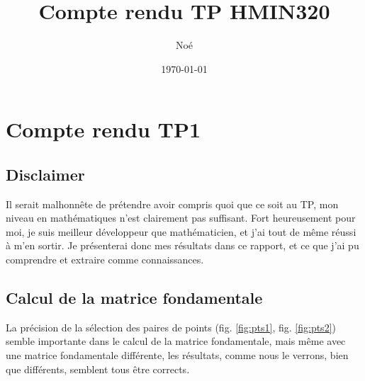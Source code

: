 \documentclass [a4 paper,11pt]{article}
\title {Compte rendu TP HMIN320}
\author {
\bsc{LE PHILIPPE} Noé\\
}
\date{\today}
\begin{document}
\makeatletter
 
\maketitle
\section{Compte rendu TP1}
\subsection{Disclaimer}
Il serait malhonnête de prétendre avoir compris quoi que ce soit au TP, mon niveau en mathématiques n'est clairement pas suffisant. Fort heureusement pour moi, je suis meilleur développeur que mathématicien, et j'ai tout de même réussi à m'en sortir. Je présenterai donc mes résultats dans ce rapport, et ce que j'ai pu comprendre et extraire comme connaissances.


\subsection{Calcul de la matrice fondamentale}
La précision de la sélection des paires de points (fig. \ref{fig:pts1}, fig. \ref{fig:pts2}) semble importante dans le calcul de la matrice fondamentale, mais même avec une matrice fondamentale différente, les résultats, comme nous le verrons, bien que différents, semblent tous être corrects.
\end{document}
